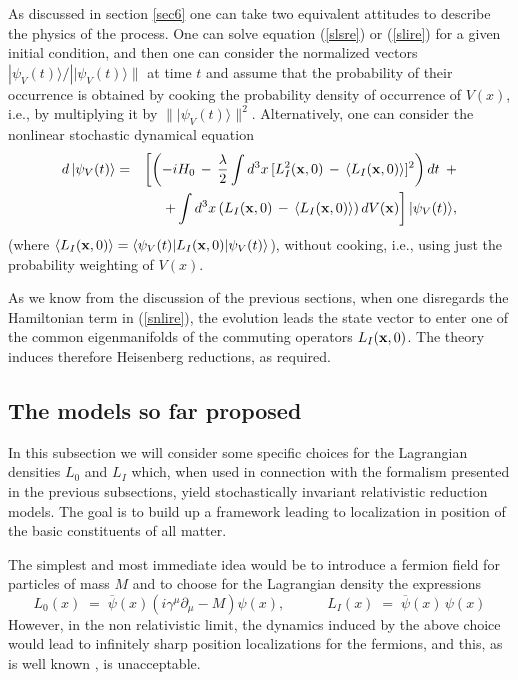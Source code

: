 \documentclass[10pt,a4paper]{article}
\begin{document}
As discussed in section \ref{sec6} one can take two equivalent
attitudes to describe the physics of the process. One can solve
equation (\ref{slsre}) or (\ref{slire}) for a given initial
condition, and then one can consider the normalized vectors
$|\psi_{V}(t)\rangle/||\psi_{V}(t)\rangle\|$ at time $t$ and
assume that the probability of their occurrence is obtained by
cooking the probability density of occurrence of $V(x)$, i.e., by
multiplying it by $\||\psi_{V}(t)\rangle\|^{2}$. Alternatively,
one can consider the nonlinear stochastic dynamical equation
\begin{eqnarray} \label{snlire}
d\,|\psi_{V}(t)\rangle & = & \left[\left( -i H_{0}\, - \,
\frac{\lambda}{2}\int d^{3}x\, [L_{I}^{2}({\bf x}, 0) \, - \,
\langle L_{I}({\bf x}, 0) \rangle]^{2} \right) dt \right.
\, + \nonumber \\
& & \left. + \int d^{3}x \left( L_{I}({\bf x}, 0) \, - \, \langle
L_{I}({\bf x}, 0) \rangle \right) dV({\bf x}) \right]
|\psi_{V}(t)\rangle,
\end{eqnarray}
(where $\langle L_{I}({\bf x}, 0) \rangle = \langle\psi_{V}(t)|
L_{I}({\bf x}, 0) |\psi_{V}(t)\rangle$), without cooking, i.e.,
using just the probability weighting of $V(x)$.

As we know from the discussion of the previous sections, when one
disregards the Hamiltonian term in (\ref{snlire}), the evolution
leads the state vector to enter one of the common eigenmanifolds
of the commuting operators $L_{I}({\bf x}, 0)$. The theory induces
therefore Heisenberg reductions, as required.


\subsection{The models so far proposed} \label{sec96}

In this subsection we will consider some specific choices for the
Lagrangian densities $L_{0}$ and $L_{I}$ which, when used in
connection with the formalism presented in the previous
subsections, yield stochastically invariant relativistic reduction
models. The goal is to build up a framework leading to
localization in position of the basic constituents of all matter.

The simplest and most immediate idea would be to introduce a
fermion field for particles of mass $M$ and to choose for the
Lagrangian density the expressions
\begin{equation}
L_{0}(x) \; = \; \overline{\psi}(x)\left(
i\gamma^{\mu}\partial_{\mu} - M\right)\psi(x), \qquad\quad
L_{I}(x) \; = \; \overline{\psi}(x)\,\psi(x)
\end{equation}
However, in the non relativistic limit, the dynamics induced by
the above choice would lead to infinitely sharp position
localizations for the fermions, and this, as is well known
\cite{gr62}, is unacceptable.
\end{document}
